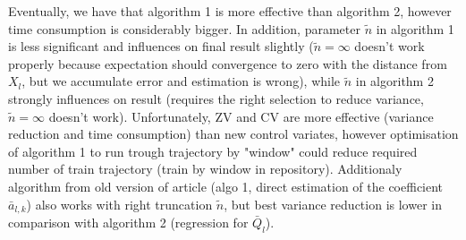 \documentclass[a4paper]{article}
\begin{document}
Eventually, we have that algorithm 1 is more effective than algorithm 2, however time consumption is considerably bigger. In addition, parameter $\tilde{n}$  in algorithm 1 is less significant and influences on final result slightly ($\tilde{n} = \infty$ doesn't work properly because expectation should convergence to zero with the distance from $X_l$, but we accumulate error and estimation is wrong), while $\tilde{n}$ in algorithm 2 strongly influences on result (requires the right selection to reduce variance, $\tilde{n} = \infty$ doesn't work).  Unfortunately, ZV and CV are more effective (variance reduction and time consumption) than new control variates, however optimisation of algorithm 1 to run trough trajectory by "window" could reduce required number of train trajectory (train by window in repository). Additionaly algorithm from old version of article (algo 1, direct estimation of the coefficient $\bar{a}_{l,k}$) also works with right truncation $\tilde{n}$, but best variance reduction is lower in comparison with algorithm 2 (regression for $\bar{Q}_l$).  
\end{document}
